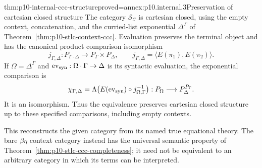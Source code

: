 \begin{hbtheorem}{thm:p10-internal-ccc-structure}{proved=annex:p10.internal.3}{Preservation of cartesian closed structure}
The category \(\mathcal S_{\mathcal C}\) is cartesian closed, using
the empty context, concatenation, and the curried-list exponential
\(\Delta^\Gamma\) of Theorem~\ref{thm:p10-stlc-context-ccc}.
Evaluation preserves the terminal object and has the canonical product
comparison isomorphism
\[
 j_{\Gamma,\Delta}:P_{\Gamma\cdot\Delta}\longrightarrow
 P_\Gamma\times P_\Delta,
 \qquad
 j_{\Gamma,\Delta}=\langle E(\pi_1),E(\pi_2)\rangle.
\]
If \(\Omega=\Delta^\Gamma\) and
\(\operatorname{ev}_{\rm syn}:\Omega\cdot\Gamma\to\Delta\) is its
syntactic evaluation, the exponential comparison is
\[
 \chi_{\Gamma,\Delta}
  =\Lambda\bigl(E(\operatorname{ev}_{\rm syn})
                   \circ j_{\Omega,\Gamma}^{-1}\bigr):
 P_\Omega\longrightarrow P_\Delta^{P_\Gamma}.
\]
It is an isomorphism.  Thus the equivalence preserves cartesian closed
structure up to these specified comparisons, including empty contexts.
\end{hbtheorem}

This reconstructs the given category from its named true equational
theory.  The bare \(\beta\eta\) context category instead has the
universal semantic property of
Theorem~\ref{thm:p10-stlc-ccc-completeness}; it need not be equivalent
to an arbitrary category in which its terms can be interpreted.
